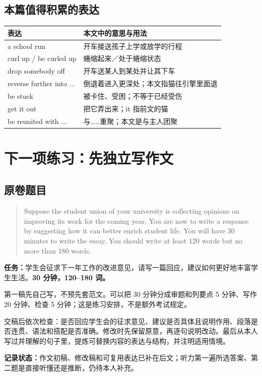 \documentclass[UTF8,a4paper,11pt,fontset=fandol]{ctexart}
\begin{document}
\subsection{本篇值得积累的表达}
\begin{tabularx}{\textwidth}{@{}lX@{}}
\toprule
表达 & 本文中的意思与用法\\
\midrule
a school run & 开车接送孩子上学或放学的行程\\
curl up / be curled up & 蜷缩起来／处于蜷缩状态\\
drop somebody off & 开车送某人到某处并让其下车\\
reverse further into ... & 倒退着进入更深处；本文指猫往引擎里面退\\
be stuck & 被卡住、受困；不等于已经受伤\\
get it out & 把它弄出来；it 指前文的猫\\
be reunited with ... & 与……重聚；本文是与主人团聚\\
\bottomrule
\end{tabularx}

\section{下一项练习：先独立写作文}
\subsection{原卷题目}
\begin{quote}\small
Suppose the student union of your university is collecting opinions on improving its work for the coming year. You are now to write a response by suggesting how it can better enrich student life. You will have 30 minutes to write the essay. You should write at least 120 words but no more than 180 words.
\end{quote}

\textbf{任务：}学生会征求下一年工作的改进意见，请写一篇回应，建议如何更好地丰富学生生活。\textbf{30 分钟，120--180 词。}

第一稿先自己写，不预先套范文。可以把 30 分钟分成审题和列要点 5 分钟、写作 20 分钟、检查 5 分钟；这是练习安排，不是额外考试规定。

交稿后依次检查：是否回应学生会的征求意见、建议是否具体且说明作用、段落是否连贯、语法和搭配是否准确。修改时先保留原意，再逐句说明改动。最后从本人写过并理解的句子里，提炼可替换内容的表达与结构，并注明适用情境。

\textbf{记录状态：}作文初稿、修改稿和可复用表达已补在后文；听力第一遍所选答案、第二题是直接听懂还是推断，仍待本人补充。

\end{document}
